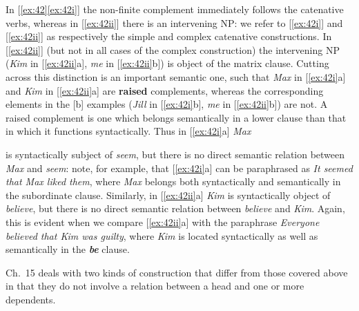 In [\ref{ex:42}\ref{ex:42i}] the non-finite complement immediately follows the catenative verbs, whereas in [\ref{ex:42ii}] there is an intervening NP: we refer to [\ref{ex:42i}] and [\ref{ex:42ii}] as respectively the {simple} and {complex catenative constructions}. In [\ref{ex:42ii}] (but not in all cases of the complex construction) the intervening NP (\textit{Kim} in [\ref{ex:42ii}a], \textit{me} in [\ref{ex:42ii}b]) is object of the matrix clause. Cutting across this distinction is an important semantic one, such that \textit{Max} in [\ref{ex:42i}a] and \textit{Kim} in [\ref{ex:42ii}a] are \textbf{raised} complements, whereas the corresponding elements in the [b] examples (\textit{Jill} in [\ref{ex:42i}b], \textit{me} in [\ref{ex:42ii}b]) are not. A raised complement is one which belongs semantically in a lower clause than that in which it functions syntactically. Thus in [\ref{ex:42i}a] \textit{Max}

\newpage

\noindent is syntactically subject of \textit{seem}, but there is no direct semantic relation between \textit{Max} and \textit{seem}: note, for example, that [\ref{ex:42i}a] can be paraphrased as \textit{It seemed that Max liked them}, where \textit{Max} belongs both syntactically and semantically in the subordinate clause. Similarly, in [\ref{ex:42ii}a] \textit{Kim} is syntactically object of \textit{believe}, but there is no direct semantic relation between \textit{believe} and \textit{Kim}. Again, this is evident when we compare [\ref{ex:42ii}a] with the paraphrase \textit{Everyone believed that Kim was guilty}, where \textit{Kim} is located syntactically as well as semantically in the \textit{\textbf{be}} clause.


Ch.~15 deals with two kinds of construction that differ from those covered above in that they do not involve a relation between a head and one or more dependents.

